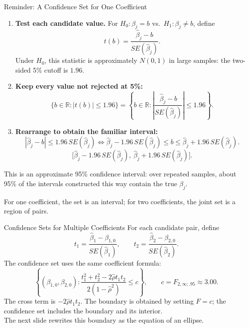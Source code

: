 \documentclass[notes,10pt, aspectratio=169]{beamer}
\begin{document}
\begin{frame}{Reminder: A Confidence Set for One Coefficient}
\small
\setlength{\abovedisplayskip}{4pt}
\setlength{\belowdisplayskip}{4pt}
\begin{enumerate}
\item \textbf{Test each candidate value.} For $H_0:\beta_j=b$ vs.\ $H_1:\beta_j\ne b$, define
\[
t(b)=\frac{\hat\beta_j-b}{SE(\hat\beta_j)}.
\]
Under $H_0$, this statistic is approximately $N(0,1)$ in large samples: the two-sided 5\% cutoff is $1.96$.
\item \textbf{Keep every value not rejected at 5\%:}
\[
\{b\in\mathbb{R}:|t(b)|\le1.96\}
=\left\{b\in\mathbb{R}:\left|\frac{\hat\beta_j-b}{SE(\hat\beta_j)}\right|\le1.96\right\}.
\]
\item \textbf{Rearrange to obtain the familiar interval:}
\[
|\hat\beta_j-b|\le1.96\,SE(\hat\beta_j)
\iff \hat\beta_j-1.96\,SE(\hat\beta_j)\le b\le\hat\beta_j+1.96\,SE(\hat\beta_j).
\]
\[
\boxed{\bigl[\hat\beta_j-1.96\,SE(\hat\beta_j),\ \hat\beta_j+1.96\,SE(\hat\beta_j)\bigr].}
\]
\end{enumerate}
This is an approximate 95\% confidence interval: over repeated samples, about 95\% of the intervals constructed this way contain the true $\beta_j$.

\medskip
For one coefficient, the set is an interval; for two coefficients, the joint set is a region of pairs.
\end{frame}


\begin{frame}{Confidence Sets for Multiple Coefficients}
For each candidate pair, define
\[t_1=\frac{\hat\beta_1-\beta_{1,0}}{SE(\hat\beta_1)},\qquad
 t_2=\frac{\hat\beta_2-\beta_{2,0}}{SE(\hat\beta_2)}.\]
The confidence set uses the same coefficient formula:
\[\left\{(\beta_{1,0},\beta_{2,0}):
\frac{t_1^2+t_2^2-2\hat\rho t_1t_2}{2(1-\hat\rho^2)}\le c\right\},
\qquad c=F_{2,\infty;.95}\approx3.00.\]
The cross term is $-2\hat\rho t_1t_2$. The boundary is obtained by setting $F=c$; the confidence set includes the boundary and its interior.\\[1em]
The next slide rewrites this boundary as the equation of an ellipse.
\end{frame}
\end{document}
